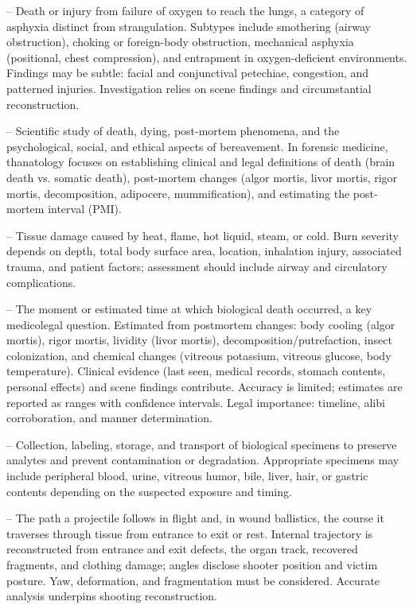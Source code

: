 -- Death or injury from failure of oxygen to reach the lungs, a category of asphyxia distinct from strangulation. Subtypes include smothering (airway obstruction), choking or foreign-body obstruction, mechanical asphyxia (positional, chest compression), and entrapment in oxygen-deficient environments. Findings may be subtle: facial and conjunctival petechiae, congestion, and patterned injuries. Investigation relies on scene findings and circumstantial reconstruction.

-- Scientific study of death, dying, post-mortem phenomena, and the psychological, social, and ethical aspects of bereavement. In forensic medicine, thanatology focuses on establishing clinical and legal definitions of death (brain death vs. somatic death), post-mortem changes (algor mortis, livor mortis, rigor mortis, decomposition, adipocere, mummification), and estimating the post-mortem interval (PMI).

-- Tissue damage caused by heat, flame, hot liquid, steam, or cold. Burn severity depends on depth, total body surface area, location, inhalation injury, associated trauma, and patient factors; assessment should include airway and circulatory complications.

-- The moment or estimated time at which biological death occurred, a key medicolegal question. Estimated from postmortem changes: body cooling (algor mortis), rigor mortis, lividity (livor mortis), decomposition/putrefaction, insect colonization, and chemical changes (vitreous potassium, vitreous glucose, body temperature). Clinical evidence (last seen, medical records, stomach contents, personal effects) and scene findings contribute. Accuracy is limited; estimates are reported as ranges with confidence intervals. Legal importance: timeline, alibi corroboration, and manner determination.

-- Collection, labeling, storage, and transport of biological specimens to preserve analytes and prevent contamination or degradation. Appropriate specimens may include peripheral blood, urine, vitreous humor, bile, liver, hair, or gastric contents depending on the suspected exposure and timing.

-- The path a projectile follows in flight and, in wound ballistics, the course it traverses through tissue from entrance to exit or rest. Internal trajectory is reconstructed from entrance and exit defects, the organ track, recovered fragments, and clothing damage; angles disclose shooter position and victim posture. Yaw, deformation, and fragmentation must be considered. Accurate analysis underpins shooting reconstruction.

